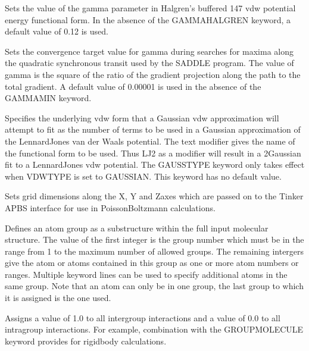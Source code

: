 \documentclass[letterpaper,11pt,english]{sphinxmanual}
\begin{document}
  Sets the value of the gamma parameter in Halgren’s buffered 14\sphinxhyphen{}7 vdw potential energy functional form. In the absence of the GAMMA\sphinxhyphen{}HALGREN keyword, a default value of 0.12 is used.

  Sets the convergence target value for gamma during searches for maxima along the quadratic synchronous transit used by the SADDLE program. The value of gamma is the square of the ratio of the gradient projection along the path to the total gradient. A default value of 0.00001 is used in the absence of the GAMMAMIN keyword.

  Specifies the underlying vdw form that a Gaussian vdw approximation will attempt to fit as the number of terms to be used in a Gaussian approximation of the Lennard\sphinxhyphen{}Jones van der Waals potential. The text modifier gives the name of the functional form to be used. Thus LJ\sphinxhyphen{}2 as a modifier will result in a 2\sphinxhyphen{}Gaussian fit to a Lennard\sphinxhyphen{}Jones vdw potential. The GAUSSTYPE keyword only takes effect when VDWTYPE is set to GAUSSIAN. This keyword has no default value.

  Sets grid dimensions along the X\sphinxhyphen{}, Y\sphinxhyphen{} and Z\sphinxhyphen{}axes which are passed on to the Tinker APBS interface for use in Poisson\sphinxhyphen{}Boltzmann calculations.




  Defines an atom group as a substructure within the full input molecular structure. The value of the first integer is the group number which must be in the range from 1 to the maximum number of allowed groups. The remaining intergers give the atom or atoms contained in this group as one or more atom numbers or ranges. Multiple keyword lines can be used to specify additional atoms in the same group. Note that an atom can only be in one group, the last group to which it is assigned is the one used.

  Assigns a value of 1.0 to all inter\sphinxhyphen{}group interactions and a value of 0.0 to all intra\sphinxhyphen{}group interactions. For example, combination with the GROUP\sphinxhyphen{}MOLECULE keyword provides for rigid\sphinxhyphen{}body calculations.
\end{document}
